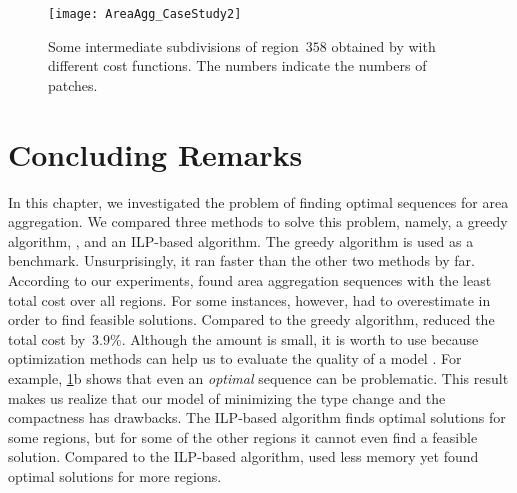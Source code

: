 \begin{figure}[h!tb]
\centering
\texttt{[image: AreaAgg\_CaseStudy2]}
\caption{Some intermediate subdivisions of region~$358$ 
	obtained by \Astar with different cost functions.
	The numbers indicate the numbers of patches.
}
\label{fig:AreaAgg_CaseStudy2_Rg358}
\end{figure}



\section{Concluding Remarks}
\label{sec:AreaAgg_Conclusions}
In this chapter, we investigated the problem of 
finding optimal sequences for area aggregation.
We compared three methods to solve this problem, namely, 
a greedy algorithm, \Astar, and an ILP-based algorithm.
The greedy algorithm is used as a benchmark.
Unsurprisingly, it ran faster than the other two methods by far.
According to our experiments, \Astar found area aggregation 
sequences
with the least total cost over all regions.
For some instances, however, \Astar had to overestimate
in order to find feasible solutions.
Compared to the greedy algorithm, 
\Astar reduced the total cost by~$3.9\%$.
Although the amount is small, it is worth to use \Astar
because optimization methods can help us to evaluate the quality 
of a model \parencite{Haunert2017Label,Haunert2008Assuring,Haunert2016Optimization}.
For example, \fig\ref{fig:AreaAgg_CaseStudy2_Rg358}b shows that
even an \emph{optimal} sequence can be problematic. 
This result makes us realize that our model of minimizing the 
type change and the compactness has drawbacks.
The ILP-based algorithm finds optimal solutions for some regions,
but for some of the other regions 
it cannot even find a feasible solution.
Compared to the ILP-based algorithm,
\Astar used less memory 
yet found optimal solutions for more regions.


